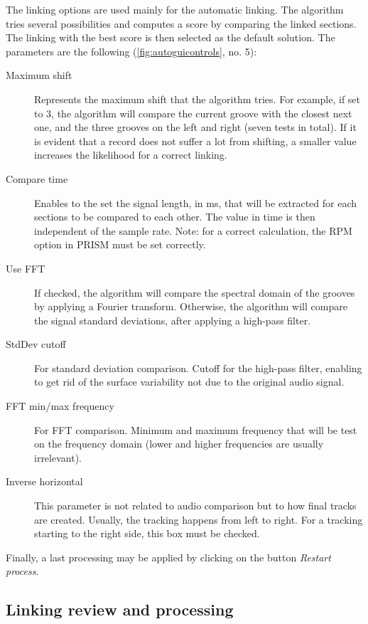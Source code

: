 The linking options are used mainly for the automatic linking. The algorithm tries several possibilities and computes a score by comparing the linked sections. The linking with the best score is then selected as the default solution. The parameters are the following (\autoref{fig:autoguicontrols}, no. 5):

\begin{description}
\item[Maximum shift] Represents the maximum shift that the algorithm tries. For example, if set to 3, the algorithm will compare the current groove with the closest next one, and the three grooves on the left and right (seven tests in total). If it is evident that a record does not suffer a lot from shifting, a smaller value increases the likelihood for a correct linking.
\item[Compare time] Enables to the set the signal length, in \si{\milli\second}, that will be extracted for each sections to be compared to each other. The value in time is then independent of the sample rate. Note: for a correct calculation, the RPM option in PRISM must be set correctly.
\item[Use FFT] If checked, the algorithm will compare the spectral domain of the grooves by applying a Fourier transform. Otherwise, the algorithm will compare the signal standard deviations, after applying a high-pass filter.
\item[StdDev cutoff] For standard deviation comparison. Cutoff for the high-pass filter, enabling to get rid of the surface variability not due to the original audio signal.
\item[FFT min/max frequency] For FFT comparison. Minimum and maximum frequency that will be test on the frequency domain (lower and higher frequencies are usually irrelevant).
\item[Inverse horizontal] This parameter is not related to audio comparison but to how final tracks are created. Usually, the tracking happens from left to right. For a tracking starting to the right side, this box must be checked.
\end{description}

Finally, a last processing may be applied by clicking on the button \emph{Restart process}.

\subsection{Linking review and processing}
\label{sec:linkreview}


